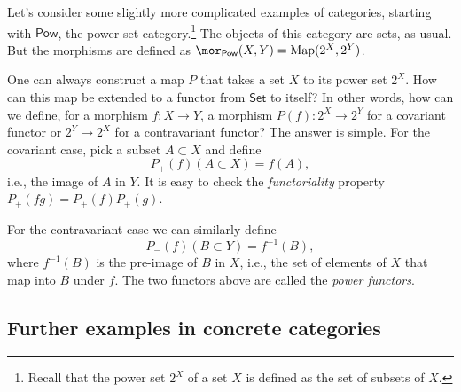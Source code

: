 %
\begin{example}
Let's consider some slightly more complicated examples of categories,
starting with $\mathsf{Pow}$, the power set category.\footnote{Recall that the power set $2^{X}$ of a set $X$ is defined as the
set of subsets of $X$.} The objects of this category are sets, as usual. But the morphisms
are defined as $\mor_{\mathsf{Pow}}(X,Y)=\text{Map}(2^{X},2^{Y})$.

One can always construct a map $P$ that takes a set $X$ to its power
set $2^{X}$. How can this map be extended to a functor from $\mathsf{Set}$
to itself? In other words, how can we define, for a morphism $f:X\rightarrow Y$,
a morphism $P(f):2^{X}\rightarrow2^{Y}$ for a covariant functor or
$2^{Y}\rightarrow2^{X}$ for a contravariant functor? The answer is
simple. For the covariant case, pick a subset $A\subset X$ and define
\begin{equation}
P_{+}(f)(A\subset X)=f(A),
\end{equation}
i.e., the image of $A$ in $Y$. It is easy to check the \emph{functoriality}
property $P_{+}\left(fg\right)=P_{+}\left(f\right)P_{+}\left(g\right)$.

For the contravariant case we can similarly define
\begin{equation}
P_{-}(f)(B\subset Y)=f^{-1}(B),
\end{equation}
where $f^{-1}(B)$ is the pre-image of $B$ in $X$, i.e., the set
of elements of $X$ that map into $B$ under $f$. The two functors
above are called the \emph{power functors}.
\end{example}

\subsection{Further examples in concrete categories}

